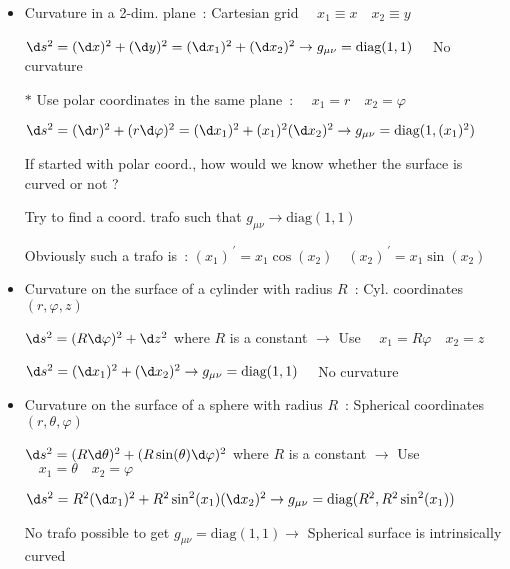 \Tr
\begin{itemize}
\item Curvature in a 2-dim. plane~: Cartesian grid $\quad x_{1} \equiv x \quad x_{2} \equiv y$
\item[] $\d s^{2}=(\d x)^{2}+(\d y)^{2}=(\d x_{1})^{2}+(\d x_{2})^{2}
        \rightarrow g_{\mu\nu}=\text{diag}(1,1) \quad$ {\blue No curvature}
\item[$\ast$] Use polar coordinates in the same plane~: $\quad x_{1}=r \quad x_{2}=\varphi$
\item[] $\d s^{2}=(\d r)^{2}+(r\d\varphi)^{2}=(\d x_{1})^{2}+(x_{1})^{2}(\d x_{2})^{2}
        \rightarrow g_{\mu\nu}=\text{diag}(1,(x_{1})^{2})$
\item[] {\blue If started with polar coord., how would we know whether the surface is curved or not ?}
\item[] Try to find a coord. trafo such that $g_{\mu\nu} \rightarrow \text{diag}(1,1)$
\item[] Obviously such a trafo is~:
        {\red $(x_{1})^{\,\prime}=x_{1}\cos(x_{2}) \quad (x_{2})^{\,\prime}=x_{1}\sin(x_{2})$}
\item Curvature on the surface of a cylinder with radius $R$~: Cyl. coordinates $(r,\varphi,z)$
\item[] $\d s^{2}=(R\d\varphi)^{2}+\d z^{2}$ where $R$ is a constant $\rightarrow$
        Use $\quad x_{1}=R\varphi \quad x_{2}=z$
\item[] $\d s^{2}=(\d x_{1})^{2}+(\d x_{2})^{2} \rightarrow g_{\mu\nu}=\text{diag}(1,1) \quad$
         {\blue No curvature}
\item Curvature on the surface of a sphere with radius $R$~: Spherical coordinates $(r,\theta,\varphi)$
\item[] $\d s^{2}=(R\d\theta)^{2}+(R\sin(\theta)\d\varphi)^{2}$ where $R$ is a constant $\rightarrow$
        Use $\quad x_{1}=\theta \quad x_{2}=\varphi$
\item[] $\d s^{2}=R^{2}(\d x_{1})^{2}+R^{2}\sin^{2}(x_{1})(\d x_{2})^{2}
         \rightarrow g_{\mu\nu}=\text{diag}(R^{2},R^{2}\sin^{2}(x_{1}))$
\item[] No trafo possible to get $g_{\mu\nu}=\text{diag}(1,1) \rightarrow$
        {\blue Spherical surface is intrinsically curved}
\end{itemize}

